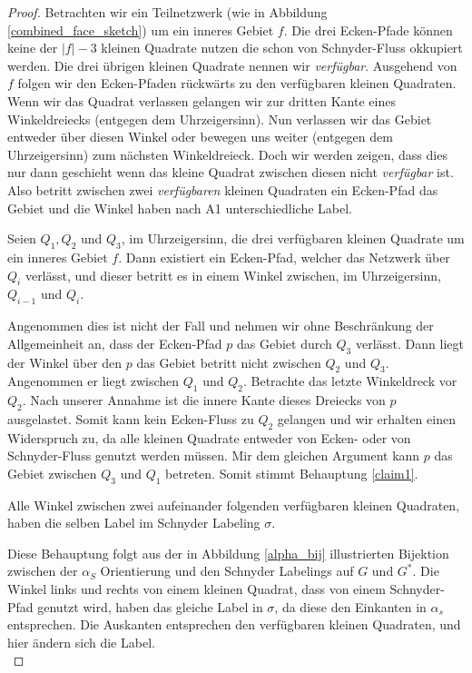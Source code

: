 \begin{proof}
Betrachten wir ein Teilnetzwerk (wie in Abbildung \ref{combined_face_sketch}) um ein inneres Gebiet $f$. Die drei Ecken-Pfade können keine der $|f|-3$ kleinen Quadrate nutzen die schon von Schnyder-Fluss okkupiert werden. Die drei übrigen kleinen Quadrate nennen wir \textit{verfügbar}. Ausgehend von $f$ folgen wir den Ecken-Pfaden rückwärts zu den verfügbaren kleinen Quadraten. Wenn wir das Quadrat verlassen gelangen wir zur dritten Kante eines Winkeldreiecks (entgegen dem Uhrzeigersinn). Nun verlassen wir das Gebiet entweder über diesen Winkel oder bewegen uns weiter (entgegen dem Uhrzeigersinn) zum nächsten Winkeldreieck. Doch wir werden zeigen, dass dies nur dann geschieht wenn das kleine Quadrat zwischen diesen nicht \textit{verfügbar} ist. Also betritt zwischen zwei \textit{verfügbaren} kleinen Quadraten ein Ecken-Pfad das Gebiet und die Winkel haben nach A1 unterschiedliche Label.

\begin{claim}\label{claim1}
Seien $Q_1,Q_2$ und $Q_3$, im Uhrzeigersinn, die drei verfügbaren kleinen Quadrate um ein inneres Gebiet $f$. Dann existiert ein Ecken-Pfad, welcher das Netzwerk über $Q_i$ verlässt, und dieser betritt es in einem Winkel zwischen, im Uhrzeigersinn, $Q_{i-1}$ und $Q_i$.
\end{claim}

Angenommen dies ist nicht der Fall und nehmen wir ohne Beschränkung der Allgemeinheit an, dass der Ecken-Pfad $p$ das Gebiet durch $Q_3$ verlässt. Dann liegt der Winkel über den $p$ das Gebiet betritt nicht zwischen $Q_2$ und $Q_3$. Angenommen er liegt zwischen $Q_1$ und $Q_2$. Betrachte das letzte Winkeldreck vor $Q_2$. Nach unserer Annahme ist die innere Kante dieses Dreiecks von $p$ ausgelastet. Somit kann kein Ecken-Fluss zu $Q_2$ gelangen und wir erhalten einen Widerspruch zu, da alle kleinen Quadrate entweder von Ecken- oder von Schnyder-Fluss genutzt werden müssen. Mir dem gleichen Argument kann $p$ das Gebiet zwischen $Q_3$ und $Q_1$ betreten. Somit stimmt Behauptung \ref{claim1}.

\begin{claim}
Alle Winkel zwischen zwei aufeinander folgenden verfügbaren kleinen Quadraten, haben die selben Label im Schnyder Labeling $\sigma$.
\end{claim}
Diese Behauptung folgt aus der in Abbildung \ref{alpha_bij} illustrierten Bijektion zwischen der $\alpha_S$ Orientierung und den Schnyder Labelings auf $G$ und $G^*$. Die Winkel links und rechts von einem kleinen Quadrat, dass von einem Schnyder-Pfad genutzt wird, haben das gleiche Label in $\sigma$, da diese den Einkanten in $\alpha_s$ entsprechen. Die Auskanten entsprechen den verfügbaren kleinen Quadraten, und hier ändern sich die Label.\\


\end{proof}
